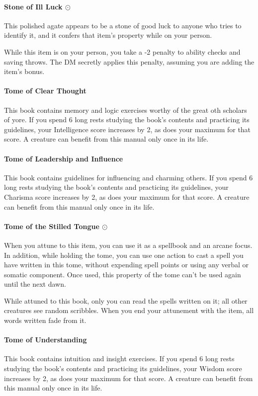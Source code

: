     \paragraph{Stone of Ill Luck $\odot$}
        This polished agate appears to be a stone of good luck to anyone who tries to identify it, and it confers that item's property while on your person.

        While this item is on your person, you take a -2 penalty to ability checks and saving throws.
        The DM secretly applies this penalty, assuming you are adding the item's bonus.
    \paragraph{Tome of Clear Thought}
        This book contains memory and logic exercises worthy of the great oth scholars of yore.
        If you spend 6 long rests studying the book's contents and practicing its guidelines, your Intelligence score increases by 2, as does your maximum for that score.
        A creature can benefit from this manual only once in its life.
    \paragraph{Tome of Leadership and Influence}
        This book contains guidelines for influencing and charming others.
        If you spend 6 long rests studying the book's contents and practicing its guidelines, your Charisma score increases by 2, as does your maximum for that score.
        A creature can benefit from this manual only once in its life.
    \paragraph{Tome of the Stilled Tongue $\odot$}
        When you attune to this item, you can use it as a spellbook and an arcane focus.
        In addition, while holding the tome, you can use one action to cast a spell you have written in this tome, without expending spell points or using any verbal or somatic component.
        Once used, this property of the tome can't be used again until the next dawn.

        While attuned to this book, only you can read the spells written on it; all other creatures see random scribbles.
        When you end your attunement with the item, all words written fade from it.
    \paragraph{Tome of Understanding}
        This book contains intuition and insight exercises.
        If you spend 6 long rests studying the book's contents and practicing its guidelines, your Wisdom score increases by 2, as does your maximum for that score.
        A creature can benefit from this manual only once in its life.
